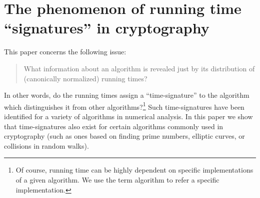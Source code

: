 \documentclass{llncs}
\numberwithin{equation}{section}
\renewcommand\({\left(}
\renewcommand\){\right)}
\begin{document}
\begin{abstract}
We consider the normalized distribution of the overall running times of some cryptographic algorithms, and what information they reveal about the algorithms.  Recent work of Deift, Menon, Olver, Pfrang, and Trogdon has shown that certain numerical algorithms applied to large random matrices
 exhibit a characteristic distribution of running times, which depends {\bf only} on the algorithm but are independent of the choice of probability distributions for the matrices.    Different algorithms often exhibit different running time distributions, and so the histograms for these running time distributions provide a {\it time-signature} for the algorithms, making it possible, in many cases, to distinguish one algorithm from another.
    In this paper we extend this analysis to  cryptographic algorithms,  and present
examples of such algorithms with
   time-signatures that are indistinguishable, and others with
   time-signatures that are clearly distinct.
%

%
\end{abstract}


\section{The phenomenon of running time ``signatures'' in cryptography}\label{sec:intro}


This paper concerns the following issue:
\begin{quote}
What information about an algorithm is revealed just by its distribution of (canonically normalized) running times?
\end{quote}
In other words, do the running times  assign a ``time-signature'' to the algorithm which distinguishes it from other algorithms?\footnote{Of course,  running time can be highly dependent on specific implementations of a given algorithm.  We use the term algorithm to refer a specific implementation.}
Such   time-signatures have  been identified for a variety of algorithms in numerical analysis. In this paper we show that time-signatures also exist for certain   algorithms commonly used in cryptography (such as ones based on finding prime numbers, elliptic curves, or collisions in random walks).
\end{document}
